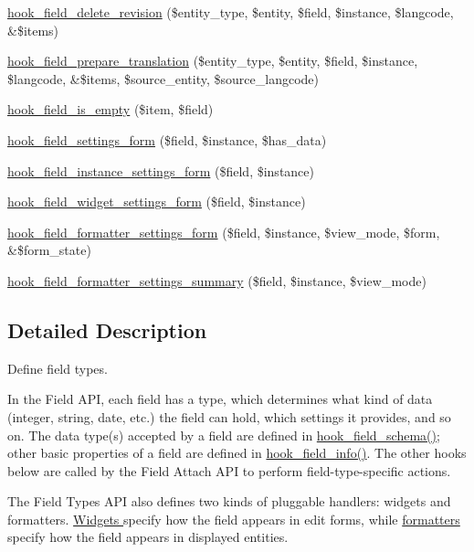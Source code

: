 \begin{DoxyCompactItemize}
\item 
\hyperlink{group__field__types_gaef667d4ba12f6fb9950876e6f4f63878}{hook\_\-field\_\-delete\_\-revision} (\$entity\_\-type, \$entity, \$field, \$instance, \$langcode, \&\$items)
\item 
\hyperlink{group__field__types_ga551145e42b305ccf93e325fc590fa379}{hook\_\-field\_\-prepare\_\-translation} (\$entity\_\-type, \$entity, \$field, \$instance, \$langcode, \&\$items, \$source\_\-entity, \$source\_\-langcode)
\item 
\hyperlink{group__field__types_ga192dd7e7a02a7bc9e0af8b67b187b071}{hook\_\-field\_\-is\_\-empty} (\$item, \$field)
\item 
\hyperlink{group__field__types_gab8a2ed808857cc6f3cb661fbc99d30d4}{hook\_\-field\_\-settings\_\-form} (\$field, \$instance, \$has\_\-data)
\item 
\hyperlink{group__field__types_gacce0ff92e36c0054ad131d95e576a13a}{hook\_\-field\_\-instance\_\-settings\_\-form} (\$field, \$instance)
\item 
\hyperlink{group__field__types_gabe5ece2134d0cbdfc3c4793f24c5866c}{hook\_\-field\_\-widget\_\-settings\_\-form} (\$field, \$instance)
\item 
\hyperlink{group__field__types_gaf9b6aefe0b4fe6c03ebd5bd9bd1b891b}{hook\_\-field\_\-formatter\_\-settings\_\-form} (\$field, \$instance, \$view\_\-mode, \$form, \&\$form\_\-state)
\item 
\hyperlink{group__field__types_ga0cdef0fb8588dde07292df1b86f06d81}{hook\_\-field\_\-formatter\_\-settings\_\-summary} (\$field, \$instance, \$view\_\-mode)
\end{DoxyCompactItemize}


\subsection{Detailed Description}
Define field types.

In the Field API, each field has a type, which determines what kind of data (integer, string, date, etc.) the field can hold, which settings it provides, and so on. The data type(s) accepted by a field are defined in \hyperlink{group__field__types_gaae7d9348e56f207a8be0b866d25252b7}{hook\_\-field\_\-schema()}; other basic properties of a field are defined in \hyperlink{group__field__types_gad3eb779f26f41b520f19af011ece3eb1}{hook\_\-field\_\-info()}. The other hooks below are called by the Field Attach API to perform field-\/type-\/specific actions.

The Field Types API also defines two kinds of pluggable handlers: widgets and formatters. \hyperlink{group__field__widget}{Widgets } specify how the field appears in edit forms, while \hyperlink{group__field__formatter}{formatters } specify how the field appears in displayed entities.

